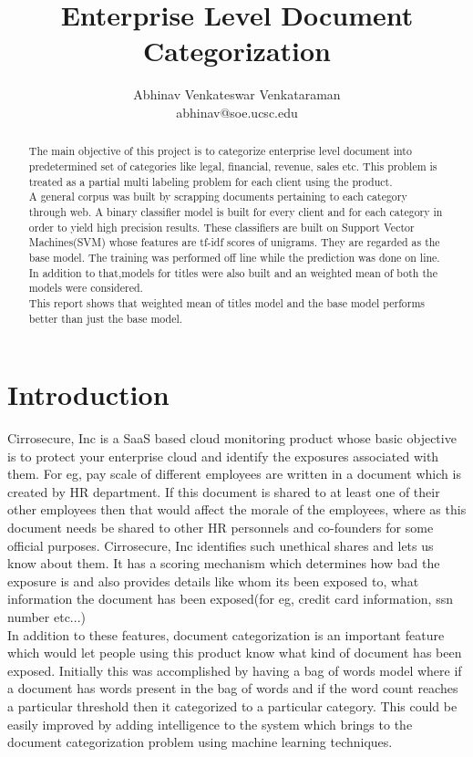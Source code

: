 \documentclass[11pt]{article}
\title{Enterprise Level Document Categorization}
\author{Abhinav Venkateswar Venkataraman \\ abhinav@soe.ucsc.edu}
\begin{document}
\maketitle
\begin{abstract}
	The main objective of this project is to categorize enterprise level document into predetermined set of categories like legal, financial, revenue, sales etc.  This problem is treated as a partial multi labeling problem for each client using the product. \\
	
	A general corpus was  built by scrapping documents pertaining to each category through web. A binary classifier model is built for every client and for each category in order to yield high precision results.  These classifiers are built on Support Vector Machines(SVM) whose features are tf-idf scores of unigrams.  They are regarded as the base model. The training was performed off line while the prediction was done on line. In addition to that,models for titles were also built and an weighted mean of both the models were considered. \\
	
	This report shows that weighted mean of titles model and the base model performs better than just the base model.
\end{abstract}
\section{Introduction}
Cirrosecure, Inc is a SaaS based cloud monitoring product  whose basic objective is to protect your enterprise cloud and identify the exposures associated with them. For eg,  pay scale of different employees are written in a document which is created by HR department. If this document is shared to at least one of their other employees then that would affect the morale of the employees, where as this document needs be shared to other HR personnels and co-founders for some official purposes. Cirrosecure, Inc identifies such unethical shares and lets us know about them. It has a scoring mechanism which determines how bad the exposure is and also provides details like whom its been exposed to, what information the document has been exposed(for eg, credit card information, ssn number etc...) \\

In addition to these features, document categorization is an important feature which would let people using this product know what kind of document has been exposed. Initially this was accomplished by having a bag of words model where if a document has words present in the bag of words and if the word count reaches a particular threshold then it categorized to a particular category. This could be easily improved by adding intelligence to the system which brings to the document categorization problem using machine learning techniques. \\
\end{document}
